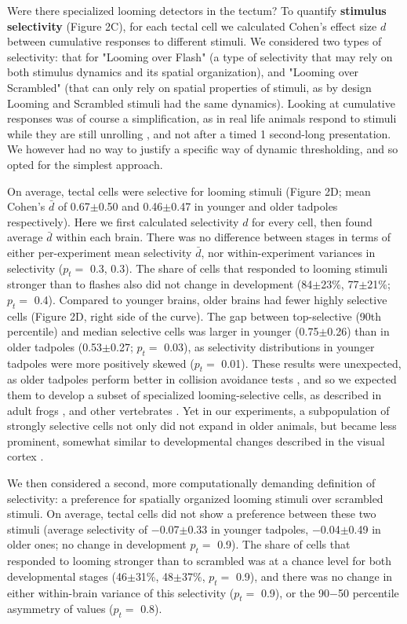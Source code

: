 \documentclass{article}
\begin{document}
Were there specialized looming detectors in the tectum? To quantify \textbf{stimulus selectivity} (Figure 2C), for each tectal cell we calculated Cohen’s effect size $d$ between cumulative responses to different stimuli. We considered two types of selectivity: that for "Looming over Flash" (a type of selectivity that may rely on both stimulus dynamics and its spatial organization), and "Looming over Scrambled" (that can only rely on spatial properties of stimuli, as by design Looming and Scrambled stimuli had the same dynamics). Looking at cumulative responses was of course a simplification, as in real life animals respond to stimuli while they are still unrolling \citep{peron2009adaptation, khakhalin2014}, and not after a timed 1 second-long presentation. We however had no way to justify a specific way of dynamic thresholding, and so opted for the simplest approach.

On average, tectal cells were selective for looming stimuli (Figure 2D; mean Cohen's $\bar d$ of 0.67$\pm$0.50 and 0.46$\pm$0.47 in younger and older tadpoles respectively). Here we first calculated selectivity $d$ for every cell, then found average $\bar d$ within each brain. There was no difference between stages in terms of either per-experiment mean selectivity $\bar d$, nor within-experiment variances in selectivity ($p_t=$ 0.3, 0.3). The share of cells that responded to looming stimuli stronger than to flashes also did not change in development (84$\pm$23\%, 77$\pm$21\%; $p_t=$ 0.4). Compared to younger brains, older brains had fewer highly selective cells (Figure 2D, right side of the curve). The gap between top-selective (90th percentile) and median selective cells was larger in younger (0.75$\pm$0.26) than in older tadpoles (0.53$\pm$0.27; $p_t=$ 0.03), as selectivity distributions in younger tadpoles were more positively skewed ($p_t=$ 0.01). These results were unexpected, as older tadpoles perform better in collision avoidance tests \citep{dong2009}, and so we expected them to develop a subset of specialized looming-selective cells, as described in adult frogs \citep{nakagawa2010otneurons, baranauskas2012}, and other vertebrates \citep{wang1992pigeon, wu2005pigeon, liu2011cat}. Yet in our experiments, a subpopulation of strongly selective cells not only did not expand in older animals, but became less prominent, somewhat similar to developmental changes described in the visual cortex \citep{rochefort2009sparsification}.

We then considered a second, more computationally demanding definition of selectivity: a preference for spatially organized looming stimuli over scrambled stimuli. On average, tectal cells did not show a preference between these two stimuli (average selectivity of $-$0.07$\pm$0.33 in younger tadpoles, $-$0.04$\pm$0.49 in older ones; no change in development $p_t=$ 0.9). The share of cells that responded to looming stronger than to scrambled was at a chance level for both developmental stages (46$\pm$31\%, 48$\pm$37\%, $p_t=$ 0.9), and there was no change in either within-brain variance of this selectivity ($p_t=$ 0.9), or the 90$-$50 percentile asymmetry of values ($p_t=$ 0.8).
\end{document}
